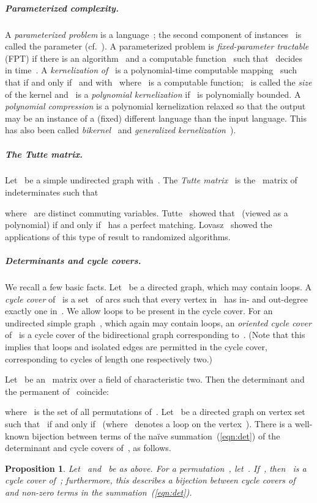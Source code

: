 \documentclass[a4paper,11pt]{article}
\newtheorem{proposition}{\textbf{Proposition}}
\begin{document}
\subparagraph*{Parameterized complexity.}
A \emph{parameterized problem} is a language~; the second component of instances~ is called the parameter (cf.~\cite{DowneyF98}). A parameterized problem is \emph{fixed-parameter tractable} (FPT) if there is an algorithm~ and a computable function~ such that~ decides~ in time~. A \emph{kernelization} \emph{of~} is a polynomial-time computable mapping~ such that  if and only if~ and with~ where~ is a computable function;~ is called the \emph{size} of the kernel and~ is a \emph{polynomial kernelization} if~ is polynomially bounded.
A \emph{polynomial compression} is a polynomial kernelization relaxed so that the output
may be an instance of a (fixed) different language than the input language. 
This has also been called \emph{bikernel}~\cite{AlonGKSY10} and \emph{generalized kernelization}~\cite{BodlaenderDFH09}).


\subparagraph*{The Tutte matrix.}
Let~ be a simple undirected graph with~. The \emph{Tutte
  matrix}~ is the~ matrix of indeterminates such that

where~ are distinct commuting variables. Tutte~\cite{Tutte47} showed that~ (viewed as a polynomial) if and only if~ has a perfect matching. 
Lovasz~\cite{Lovasz79} showed the applications of this type of result to randomized
algorithms. 

\subparagraph*{Determinants and cycle covers.}
We recall a few basic facts.
Let~ be a directed graph, which may contain loops. A \emph{cycle cover} of~
is a set~ of arcs such that every vertex in~ has in- and out-degree
exactly one in~. We allow loops to be present in the cycle cover. For an undirected
simple graph~, which again may contain loops, an \emph{oriented cycle cover} of~ is
a cycle cover of the bidirectional graph corresponding to~. (Note that this implies
that loops and isolated edges are permitted in the cycle cover, corresponding to cycles of
length one respectively two.) 

Let~ be an~ matrix over a field of characteristic two. Then the determinant
and the permanent of~ coincide:

where~ is the set of all permutations of~. Let~ be a directed graph on vertex
set~ such that~ if and only if~
(where~ denotes a loop on the vertex~). There is a well-known bijection
between terms of the na\"ive summation~(\ref{eqn:det}) of the determinant and cycle covers
of~, as follows.

\begin{proposition}
\label{prop:cyclecovers}
Let~ and~ be as above. For a permutation~,
let~. If~, then~
is a cycle cover of~; furthermore, this describes a bijection between cycle covers
of~ and non-zero terms in the summation~(\ref{eqn:det}). 
\end{proposition}
\end{document}
